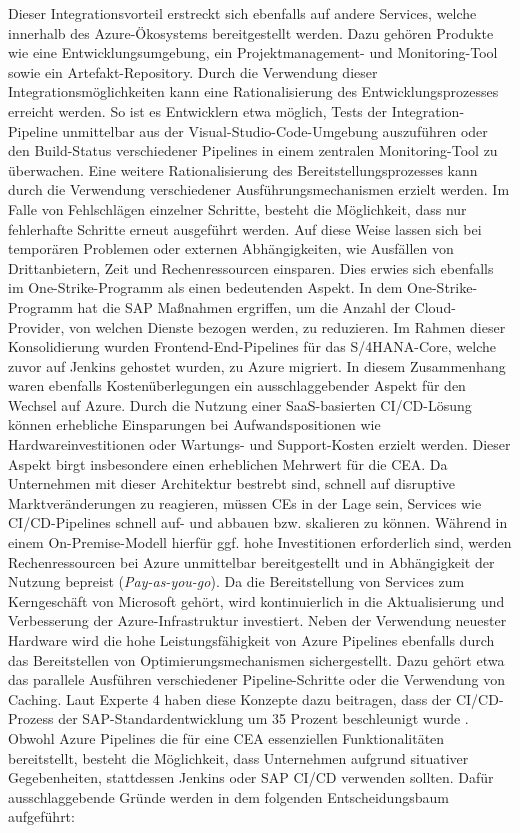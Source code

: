 Dieser Integrationsvorteil erstreckt sich ebenfalls auf andere Services, welche innerhalb des Azure-Ökosystems bereitgestellt werden. Dazu gehören Produkte wie eine Entwicklungsumgebung, ein Projektmanagement- und Monitoring-Tool sowie ein Artefakt-Repository. Durch die Verwendung dieser Integrationsmöglichkeiten kann eine Rationalisierung des Entwicklungsprozesses erreicht werden. So ist es Entwicklern etwa möglich, Tests der Integration-Pipeline unmittelbar aus der Visual-Studio-Code-Umgebung auszuführen oder den Build-Status verschiedener Pipelines in einem zentralen Monitoring-Tool zu überwachen. Eine weitere Rationalisierung des Bereitstellungsprozesses kann durch die Verwendung verschiedener Ausführungs\-mechanismen erzielt werden. Im Falle von Fehlschlägen einzelner Schritte, besteht die Möglichkeit, dass nur fehlerhafte Schritte erneut ausgeführt werden. Auf diese Weise lassen sich bei temporären Problemen oder externen Abhängigkeiten, wie Ausfällen von Drittanbietern, Zeit und Rechenressourcen einsparen. Dies erwies sich ebenfalls im One-Strike-Programm als einen bedeutenden Aspekt. In dem One-Strike-Programm hat die SAP Maßnahmen ergriffen, um die Anzahl der Cloud-Provider, von welchen Dienste bezogen werden, zu reduzieren. Im Rahmen dieser Konsolidierung wurden Frontend-End-Pipelines für das S/4HANA-Core, welche zuvor auf Jenkins gehostet wurden, zu Azure migriert. In diesem Zusammenhang waren ebenfalls Kostenüberlegungen ein ausschlaggebender Aspekt für den Wechsel auf Azure. Durch die Nutzung einer SaaS-basierten CI/CD-Lösung können erhebliche Einsparungen bei Aufwandspositionen wie Hardwareinvestitionen oder Wartungs- und Support-Kosten erzielt werden. Dieser Aspekt birgt insbesondere einen erheblichen Mehrwert für die CEA. Da Unternehmen mit dieser Architektur bestrebt sind, schnell auf disruptive Marktveränderungen zu reagieren, müssen CEs in der Lage sein, Services wie CI/CD-Pipelines schnell auf- und abbauen bzw. skalieren zu können. Während in einem On-Premise-Modell hierfür ggf. hohe Investitionen erforderlich sind, werden Rechenressourcen bei Azure unmittelbar bereitgestellt und in Abhängigkeit der Nutzung bepreist (\textit{Pay-as-you-go}). Da die Bereitstellung von Services zum Kerngeschäft von Microsoft gehört, wird kontinuierlich in die Aktualisierung und Verbesserung der Azure-Infrastruktur investiert. Neben der Verwendung neuester Hardware wird die hohe Leistungsfähigkeit von Azure Pipelines ebenfalls durch das Bereitstellen von Optimierungsmechanismen sichergestellt. Dazu gehört etwa das parallele Ausführen verschiedener Pipeline-Schritte oder die Verwendung von Caching. Laut Experte 4 haben diese Konzepte dazu beitragen, dass der CI/CD-Prozess der SAP-Standardentwicklung um 35 Prozent beschleunigt wurde \cite[Z. 58 ff.]{TestDeveloperSAPHyperspaceAdoption&Onboarding.}.\\ Obwohl Azure Pipelines die für eine CEA essenziellen Funktionalitäten bereitstellt, besteht die Möglichkeit, dass Unternehmen aufgrund situativer Gegebenheiten, stattdessen Jenkins oder SAP CI/CD verwenden sollten. Dafür ausschlaggebende Gründe werden in dem folgenden Entscheidungsbaum aufgeführt:
